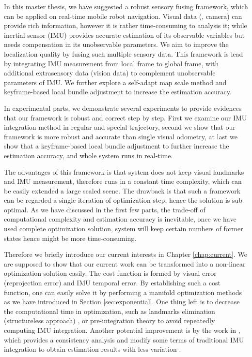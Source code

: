 
In this master thesis, we have suggested a robust sensory fusing framework, which can be applied on real-time mobile robot navigation. Visual data (\eg, camera) can provide rich information, however it is rather time-consuming to analysis it; while inertial sensor (IMU) provides accurate estimation of its observable variables but needs compensation in its unobservable parameters. We aim to improve the localization quality by fusing such multiple sensory data. This framework is lead by integrating IMU measurement from local frame to global frame, with additional extrasensory data (vision data) to complement unobservable parameters of IMU. We further explore a self-adapt map scale method and keyframe-based local bundle adjustment to increase the estimation accuracy.

In experimental parts, we demonstrate several experiments to provide evidences that our framework is robust and correct step by step. First we examine our IMU integration method in regular and special trajectory, second we show that our framework is more robust and accurate than single visual odometry, at last we show that a keyframe-based local bundle adjustment to further increase the estimation accuracy, and whole system runs in real-time.

The advantages of this framework is that system does not keep visual landmarks and IMU measurement, therefore runs in a constant time complexity, which can be easily extended a large scaled scene. The drawback is that such a framework can be regarded a single iteration of optimization step, hence the solution is sub-optimal. As we have discussed in the first few parts, the trade-off of computational complexity and estimation accuracy is inevitable, once we have used complete optimization solution, system will keep certain numbers of former states hence might be more time-consuming.

Therefore we briefly introduce our current interests in Chapter \ref{chap:current}. We are supposed to show that our current work can be transformed into a non-linear optimization solution easily. The cost function is formed by visual error (reprojection error) and IMU temporal error. By establishing such a cost function, one can easily solve it by performing a manifold optimization methods as we have introduced in Section \ref{sec:exponential}. One thing left is to decrease the computational time in optimization, such as landmarks elimination (structureless approach) \cite{mourikis2007multi, forster2015imu}, or pre-integration theory \cite{forster2015imu} to avoid repeatedly computing IMU integration. Another potential improvement is by the work in \cite{hesch2014consistency}, which provides a consistency analysis and modify some terms of traditional IMU integration to obtain estimation results with less variation .


